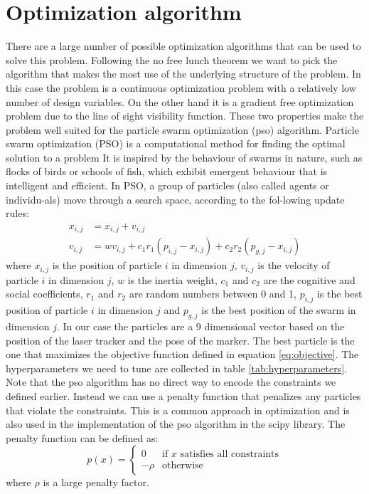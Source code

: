 \documentclass{svproc}
\begin{document}
\section{Optimization algorithm}
There are a large number of possible optimization algorithms that can be used to solve this problem.
Following the no free lunch theorem we want to pick the algorithm that makes the most use of the underlying structure of the problem. %
In this case the problem is a continuous optimization problem with a relatively low number of design variables.
On the other hand it is a gradient free optimization problem due to the line of sight visibility function.
These two properties make the problem well suited for the particle swarm optimization (pso) algorithm.
Particle swarm optimization (PSO) is a computational method for finding the optimal solution to a problem
 It is inspired by the behaviour of swarms in nature, such as flocks of birds or schools of fish, which exhibit emergent behaviour that is intelligent and efficient.
 In PSO, a group of particles (also called agents or individu-als) move through a search space, according to the fol-lowing update rules:
\begin{equation}
        \begin{split}
        x_{i,j} &= x_{i,j} + v_{i,j} \\
    v_{i,j} &= wv_{i,j} + c_1r_1(p_{i,j}-x_{i,j}) + c_2r_2(p_{g,j}-x_{i,j})
        \end{split}
\end{equation}
where $x_{i,j}$ is the position of particle $i$ in dimension $j$, $v_{i,j}$ is the velocity of particle $i$ in dimension $j$, $w$ is the inertia weight,
 $c_1$ and $c_2$ are the cognitive and social coefficients, $r_1$ and $r_2$ are random numbers between 0 and 1, $p_{i,j}$ is the best position of particle $i$ in dimension $j$ and $p_{g,j}$
is the best position of the swarm in dimension $j$.
In our case the particles are a 9 dimensional vector based on the position of the laser tracker and the pose of the marker.
The best particle is the one that maximizes the objective function defined in equation \ref{eq:objective}.
The hyperparameters we need to tune are collected in table \ref{tab:hyperparameters}.
Note that the pso algorithm has no direct way to encode the constraints we defined earlier.
Instead we can use a penalty function that penalizes any particles that violate the constraints.
This is a common approach in optimization and is also used in the implementation of the pso algorithm in the scipy library. %
The penalty function can be defined as:
\begin{equation}
    p(x) =  \begin{cases}
        0 & \text{if } x \text{ satisfies all constraints} \\
        -\rho & \text{otherwise}
    \end{cases}
\end{equation}
where $\rho$ is a large penalty factor.
\end{document}
